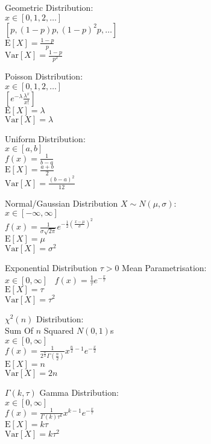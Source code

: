 Geometric Distribution: \\
$x \in [0,1,2,\dots]$ \\
$[p,(1-p)p,(1-p)^2p,\dots]$ \\
$\text{E}[X]=\frac{1-p}{p}$ \\
$\text{Var}[X]=\frac{1-p}{p^2}$

Poisson Distribution: \\
$x \in [0,1,2,\dots]$ \\
$[e^{-\lambda}\frac{\lambda^x}{x!}]$ \\
$\text{E}[X]=\lambda$ \\
$\text{Var}[X]=\lambda$

Uniform Distribution: \\
$x \in [a,b]$ \\
$f(x) = \frac{1}{b-a}$ \\
$\text{E}[X] = \frac{a+b}{2}$ \\
$\text{Var}[X] = \frac{(b-a)^2}{12}$

Normal/Gaussian Distribution $X \sim N(\mu,\sigma)$: \\
$x \in [-\infty,\infty]$ \\
$f(x) = \frac{1}{\sigma\sqrt{2\pi}}e^{-\frac{1}{2} \left( \frac{x-\mu}{\sigma} \right)^2}$ \\
$\text{E}[X]=\mu$ \\
$\text{Var}[X]=\sigma^2$

Exponential Distribution $\tau>0$ Mean Parametrisation: \\
$x \in [0,\infty]$ \
$f(x) = \frac{1}{\tau} e^{-\frac{x}{\tau}}$ \\
$\text{E}[X] = \tau$ \\
$\text{Var}[X] = \tau^2$

$\chi^2 (n)$ Distribution: \\
Sum Of $n$ Squared $N(0,1)$s \\
$x \in [0,\infty]$ \\
$f(x) = \frac{1}{2^{\frac{n}{2}} \Gamma (\frac{n}{2})} x^{\frac{n}{2}-1} e^{-\frac{x}{2}}$ \\
$\text{E}[X]=n$ \\
$\text{Var}[X]=2n$

$\Gamma (k,\tau)$ Gamma Distribution: \\
$x \in [0,\infty]$ \\
$f(x) = \frac{1}{\Gamma (k) \tau^k} x^{k-1} e^{-\frac{x}{\tau}}$ \\
$\text{E}[X]=k\tau$ \\
$\text{Var}[X]=k\tau^2$

